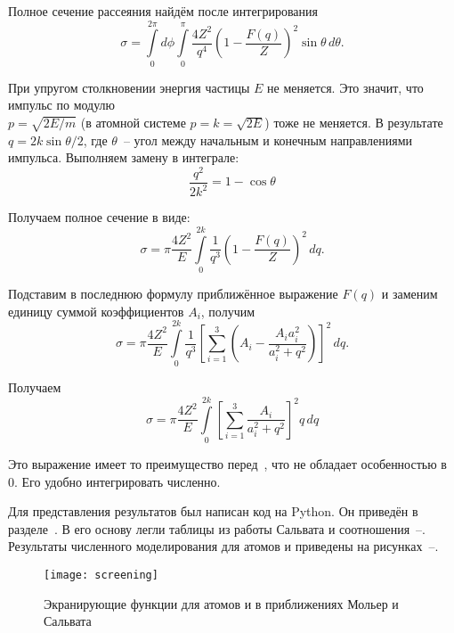   Полное сечение рассеяния найдём после интегрирования
  \begin{equation}
    \sigma = \int\limits_0^{2\pi} d\phi \int\limits_0^\pi \frac{4Z^2}{q^4}
      \left( 1 - \frac{F(q)}{Z} \right)^2 \sin\theta\,d\theta.
  \end{equation}

  При упругом столкновении энергия частицы \( E \) не меняется. Это
  значит, что импульс по модулю \\ \( p = \sqrt{2E/m} \) (в атомной системе
  \( p = k = \sqrt{2E} \)) тоже не меняется. В результате
  \( q = 2 k \sin \theta / 2\), где \( \theta \)~-- угол между начальным и
  конечным направлениями импульса. Выполняем замену в интеграле:
  \[
    \frac{q^2}{2k^2} = 1-\cos \theta
  \]

  Получаем полное сечение в виде:
  \begin{equation}
    \sigma = \pi \frac{4Z^2}{E} \int\limits_0^{2k} \frac{1}{q^3}
      \left( 1 - \frac{F(q)}{Z} \right)^2\,dq.
    \label{eq:full}
  \end{equation}

  Подставим в последнюю формулу приближённое выражение \( F(q) \)
  и заменим единицу суммой коэффициентов \( A_i \), получим
  \[
    \sigma = \pi \frac{4Z^2}{E} \int\limits_0^{2k} \frac{1}{q^3}
      \left[ \sum_{i = 1}^3 \left( A_i - \frac{A_ia_i^2}{a_i^2 + q^2} \right)
      \right]^2\,dq.
  \]

  Получаем
  \begin{equation}
    \sigma = \pi \frac{4Z^2}{E} \int\limits_0^{2k}
      \left[ \sum_{i = 1}^3 \frac{A_i}{a_i^2 + q^2}  \right]^2 q\,dq
    \label{eq:sect}
  \end{equation}

  Это выражение имеет то преимущество перед~, что
  не обладает особенностью в 0. Его удобно интегрировать
  численно.

  Для представления результатов был написан код на Python.
  Он приведён в разделе~. В его основу легли
  таблицы из работы Сальвата и
  соотношения~--. Результаты численного
  моделирования для атомов \seat и \fiat приведены на
  рисунках~--.

  \begin{figure}[h!]
    \centering
    \texttt{[image: screening]}
    \caption{Экранирующие функции для атомов \fiat и
      \seat в приближениях Мольер и Сальвата}
    \label{fig:screening}
    \end{figure}

